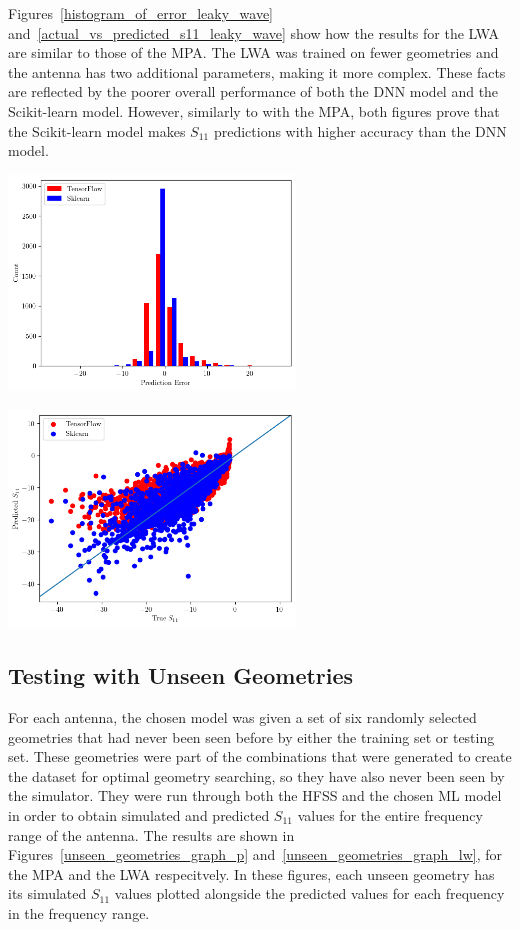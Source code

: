 \documentclass[conference]{IEEEtran}
\newenvironment{Figure}
    {\par\medskip\noindent\minipage{\linewidth}}
    {\endminipage\par\medskip}
\begin{document}
Figures~\ref{histogram_of_error_leaky_wave} and~\ref{actual_vs_predicted_s11_leaky_wave} show how the results for the LWA are similar to those of the MPA. The LWA was trained on fewer geometries and the antenna has two additional parameters, making it more complex. These facts are reflected by the poorer overall performance of both the DNN model and the Scikit-learn model. However, similarly to with the MPA, both figures prove that the Scikit-learn model makes $S_{11}$ predictions with higher accuracy than the DNN model.

\begin{Figure}
    \centering
    \includegraphics[width=3in]{histogram_leaky_wave}
    \label{histogram_of_error_leaky_wave}
\end{Figure}

\begin{Figure}
    \centering
    \includegraphics[width=3in]{actual_vs_predicted_s11_leaky_wave}
    \label{actual_vs_predicted_s11_leaky_wave}
\end{Figure}

\subsection{Testing with Unseen Geometries}
For each antenna, the chosen model was given a set of six randomly selected geometries that had never been seen before by either the training set or testing set. These geometries were part of the combinations that were generated to create the dataset for optimal geometry searching, so they have also never been seen by the simulator. They were run through both the HFSS and the chosen ML model in order to obtain simulated and predicted $S_{11}$ values for the entire frequency range of the antenna. The results are shown in Figures~\ref{unseen_geometries_graph_p} and~\ref{unseen_geometries_graph_lw}, for the MPA and the LWA respecitvely. In these figures, each unseen geometry has its simulated $S_{11}$ values plotted alongside the predicted values for each frequency in the frequency range.
\end{document}
